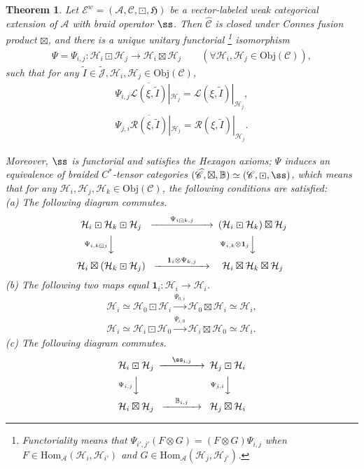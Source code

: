 \documentclass[12pt,a4paper]{article}
\theoremstyle{definition}
\theoremstyle{plain}
\newtheorem{thm}[df]{Theorem}
\newcommand{\fk}{\mathfrak}
\newcommand{\mc}{\mathcal}
\newcommand{\wtd}{\widetilde}
\newcommand{\wht}{\widehat}
\newcommand{\ovl}{\overline}
\newcommand{\id}{\mathbf{1}}
\newcommand{\Hom}{\mathrm{Hom}}
\newcommand{\scr}{\mathscr}
\newcommand{\Jtd}{\widetilde{\mathcal J}}
\newcommand{\mbb}{\mathbb}
\newcommand{\Obj}{\mathrm{Obj}}
\numberwithin{equation}{subsection}
\begin{document}
\begin{thm}\label{lb34}
Let $\scr E^w=(\mc A,\scr C,\boxdot,\fk H)$ be a vector-labeled weak categorical extension of $\mc A$ with braid operator $\ss$. Then $\wht{\scr C}$ is  closed under Connes fusion product $\boxtimes$, and there is a unique unitary functorial \footnote{Functoriality means that $\Psi_{i',j'}(F\otimes G)=(F\otimes G)\Psi_{i,j}$ when $F\in\Hom_{\mc A}(\mc H_i,\mc H_{i'})$ and $G\in\Hom_{\mc A}(\mc H_j,\mc H_{j'})$.} isomorphism
\begin{align}
\Psi=\Psi_{i,j}:\mc H_i\boxdot\mc H_j\rightarrow\mc H_i\boxtimes\mc H_j\qquad(\forall \mc H_i,\mc H_j\in\Obj(\scr C)),
\end{align}
such that for any $\wtd I\in\Jtd,\mc H_i,\mc H_j\in\Obj(\scr C)$,
\begin{gather}
\Psi_{i,j}\ovl{\mc L(\xi,\wtd I)}|_{\mc H_j}=\scr L(\xi,\wtd I)|_{\mc H_j},\label{eq20}\\
\Psi_{j,i}\ovl{\mc R(\xi,\wtd I)}|_{\mc H_j}=\scr R(\xi,\wtd I)|_{\mc H_j}.\label{eq21}
\end{gather}

Moreover, $\ss$ is functorial and satisfies the Hexagon axioms; $\Psi$ induces an equivalence of braided $C^*$-tensor categories $(\wht{\scr C},\boxtimes,\mathbb B)\simeq(\scr C,\boxdot,\ss)$, which means that for any $\mc H_i,\mc H_j,\mc H_k\in\Obj(\scr C)$, the following conditions are satisfied:\\
	(a) The following diagram commutes.
	\begin{gather}
	\begin{CD}
	\mc H_i\boxdot\mc H_k\boxdot\mc H_j @>~~\quad \Psi_{i\boxdot k,j} \quad~~>> (\mc H_i\boxdot \mc H_k)\boxtimes\mc H_j\\
	@V \Psi_{i,k\boxdot j} VV @V \Psi_{i,k}\otimes\id_j VV\\
	\mc H_i\boxtimes(\mc H_k\boxdot\mc H_j) @> \quad \id_i\otimes\Psi_{k,j} \quad>> \mc H_i\boxtimes\mc H_k\boxtimes\mc H_j
	\end{CD}\label{eq24}
	\end{gather}
	(b) The following two maps equal $\id_i:\mc H_i\rightarrow\mc H_i$.
	\begin{gather}
	\mc H_i\simeq \mc H_0\boxdot\mc H_i\xrightarrow{\Psi_{0,i}} \mc H_0\boxtimes\mc H_i\simeq\mc H_i,\\
	\mc H_i\simeq \mc H_i\boxdot\mc H_0\xrightarrow{\Psi_{i,0}} \mc H_i\boxtimes\mc H_0\simeq\mc H_i. 
	\end{gather}
	(c) The following diagram commutes.
	\begin{gather}
	\begin{CD}
	\mc H_i\boxdot\mc H_j @> \quad\ss_{i,j} \quad>> \mc H_j\boxdot\mc H_i\\
	@V \Psi_{i,j} VV @V \Psi_{j,i} VV\\
	\mc H_i\boxtimes\mc H_j @>\quad\mbb B_{i,j}\quad>> \mc H_j\boxtimes\mc H_i
	\end{CD}
	\end{gather}
\end{thm}
\end{document}

